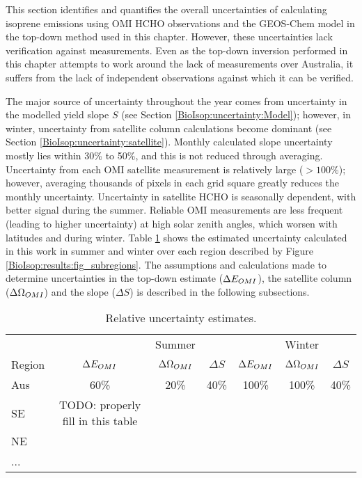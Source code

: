   This section identifies and quantifies the overall uncertainties of calculating isoprene emissions using OMI HCHO observations and the GEOS-Chem model in the top-down method used in this chapter.
  However, these uncertainties lack verification against measurements.
  Even as the top-down inversion performed in this chapter attempts to work around the lack of measurements over Australia, it suffers from the lack of independent observations against which it can be verified.
  
  The major source of uncertainty throughout the year comes from uncertainty in the modelled yield slope $S$ (see Section \ref{BioIsop:uncertainty:Model}); however, in winter, uncertainty from satellite column calculations become dominant (see Section \ref{BioIsop:uncertainty:satellite}).
  Monthly calculated slope uncertainty mostly lies within 30\% to 50\%, and this is not reduced through averaging.
  Uncertainty from each OMI satellite measurement is relatively large ($>100\%$); however, averaging thousands of pixels in each grid square greatly reduces the monthly uncertainty.
  Uncertainty in satellite HCHO is seasonally dependent, with better signal during the summer.
  Reliable OMI measurements are less frequent (leading to higher uncertainty) at high solar zenith angles, which worsen with latitudes and during winter.
  Table \ref{BioIsop:uncertainty:tab_uncertainties} shows the estimated uncertainty calculated in this work in summer and winter over each region described by Figure \ref{BioIsop:results:fig_subregions}.
  The assumptions and calculations made to determine uncertainties in the top-down estimate ($\Delta E_{OMI}$), the satellite column ($\Delta \Omega_{OMI}$) and the slope ($\Delta S$) is described in the following subsections.
  
  \begin{table}\begin{threeparttable}
      \caption{Relative uncertainty estimates.}
      \begin{tabular}{ l | c  c  c | c c c} 
        \toprule
        & & Summer & & & Winter & \\
        Region & $\Delta E_{OMI}$ & $\Delta \Omega_{OMI}$ & $\Delta S$ 
          & $\Delta E_{OMI}$ & $\Delta \Omega_{OMI}$ & $\Delta S$ \\
         
        \midrule
          Aus & 60\% &  20\% &  40\%  & 100\% & 100\% &  40\%  \\
          SE & TODO: properly fill in this table & & & & & \\
          NE & & & & & & \\
          ... & & & & & & \\
        \bottomrule
      \end{tabular}
      \label{BioIsop:uncertainty:tab_uncertainties}
    \end{threeparttable}\end{table}
    
